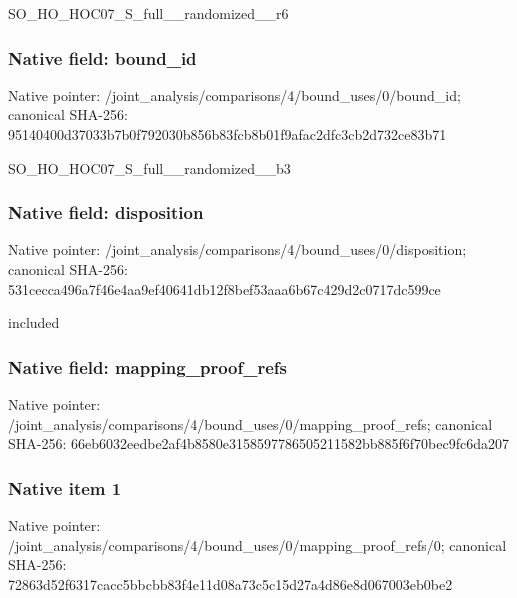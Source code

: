 \documentclass[10pt,a4paper]{article}
\begin{document}
\begingroup\raggedright\sloppy SO\_\allowbreak{}HO\_\allowbreak{}HOC07\_\allowbreak{}S\_\allowbreak{}full\_\allowbreak{}\_\allowbreak{}randomized\_\allowbreak{}\_\allowbreak{}r6\par\endgroup

\subsubsection{Native field: bound\_\allowbreak{}id}
Native pointer: /joint\_\allowbreak{}analysis/comparisons/4/bound\_\allowbreak{}uses/0/bound\_\allowbreak{}id; canonical SHA-256: 95140400d37033b7b0f792030b856b83fcb8b01f9afac2dfc3cb2d732ce83b71

\begingroup\raggedright\sloppy SO\_\allowbreak{}HO\_\allowbreak{}HOC07\_\allowbreak{}S\_\allowbreak{}full\_\allowbreak{}\_\allowbreak{}randomized\_\allowbreak{}\_\allowbreak{}b3\par\endgroup

\subsubsection{Native field: disposition}
Native pointer: /joint\_\allowbreak{}analysis/comparisons/4/bound\_\allowbreak{}uses/0/disposition; canonical SHA-256: 531cecca496a7f46e4aa9ef40641db12f8bef53aaa6b67c429d2c0717dc599ce

\begingroup\raggedright\sloppy included\par\endgroup

\subsubsection{Native field: mapping\_\allowbreak{}proof\_\allowbreak{}refs}
Native pointer: /joint\_\allowbreak{}analysis/comparisons/4/bound\_\allowbreak{}uses/0/mapping\_\allowbreak{}proof\_\allowbreak{}refs; canonical SHA-256: 66eb6032eedbe2af4b8580e3158597786505211582bb885f6f70bec9fc6da207

\subsubsection{Native item 1}
Native pointer: /joint\_\allowbreak{}analysis/comparisons/4/bound\_\allowbreak{}uses/0/mapping\_\allowbreak{}proof\_\allowbreak{}refs/0; canonical SHA-256: 72863d52f6317cacc5bbcbb83f4e11d08a73c5c15d27a4d86e8d067003eb0be2
\end{document}
